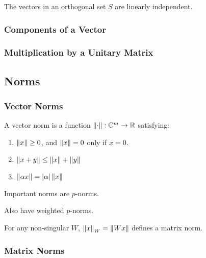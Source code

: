 \documentclass[12pt]{article}
\begin{document}
\begin{theorem}
    The vectors in an orthogonal set \( S \) are linearly independent.
\end{theorem}


\subsubsection{Components of a Vector}

\begin{definition}
\end{definition}

\subsubsection{Multiplication by a Unitary Matrix}

\subsection{Norms}

\subsubsection{Vector Norms}
\begin{definition}
    A vector norm is a function \( \left\lVert\cdot\right\rVert:\mathbb{C}^m\to\mathbb{R} \) satisfying:
    \begin{enumerate}[label=(\roman*), nolistsep]
        \item \( \left\lVert x\right\rVert \geq 0 \), and \( \left\lVert x\right\rVert = 0 \) only if \( x = 0 \).
        \item \( \left\lVert x+y\right\rVert\leq \left\lVert x\right\rVert + \left\lVert y\right\rVert \)
        \item \( \left\lVert\alpha x\right\rVert = |\alpha| \left\lVert x\right\rVert \)
    \end{enumerate}
\end{definition}

Important norms are \( p \)-norms.

Also have weighted \( p \)-norms.

For any non-singular \( W \), \( \left\lVert x\right\rVert_W = \left\lVert Wx\right\rVert \) defines a matrix norm.

\subsubsection{Matrix Norms}
\end{document}
